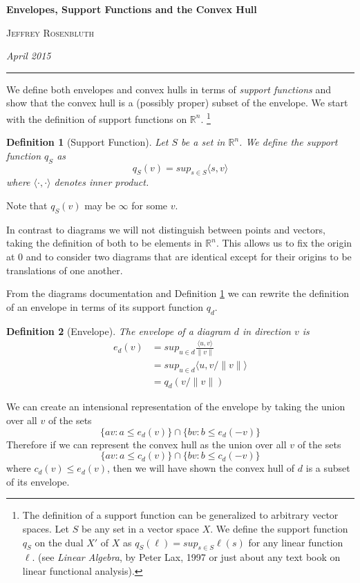 \documentclass[11pt]{amsart}
\newtheorem{defn}{Definition}
\begin{document}
\begin{center}
\bigskip 
\textbf{Envelopes, Support Functions and the Convex Hull}

\textsc{Jeffrey Rosenbluth}

\textit{April 2015}
\end{center}
\hrule
\vspace{0.25in}

We define both envelopes and convex hulls in terms of \emph{support functions} and show
that the convex hull is a (possibly proper) subset of the envelope. We start with the definition of support functions
on  $\mathbb{R}^n$.
\footnote{
The definition of a support function can be generalized to arbitrary vector spaces.
Let $S$ be any set in a vector space $X$. We define the support function $q_S$ on the dual $X'$ of $X$ as 
$q_S(\ell) = sup_{s \in S} \ell(s)$
for any linear function $\ell.$ 
(see \emph{Linear Algebra}, by Peter Lax, 1997 or just about any  text book on linear functional analysis).
}
\begin{defn}[Support Function]
\label{supportfunc}
Let $S$ be a set in $\mathbb{R}^n$. We define the support function $q_S$ as 
$$q_S(v) = sup_{s \in S} \langle s,v \rangle$$
where $\langle \cdot, \cdot \rangle$ denotes inner product.
\end{defn}

Note that $q_S(v)$ may be $\infty$ for some $v$. 

In contrast to diagrams we will not distinguish between points and vectors, taking the definition of both to be elements in $\mathbb{R}^n$.
This allows us to fix the origin at $0$ and to consider two diagrams that are identical except for their origins to be translations of one another.

From the diagrams documentation and Definition \ref{supportfunc} we can rewrite the definition of an envelope 
in terms of its support function $q_d$.
\begin{defn}[Envelope]
The envelope of a diagram $d$ in direction $v$ is
\begin{align}
e_d(v) &= sup_{u \in d} \frac{\langle u, v \rangle}{\|v\|}\\
           &=sup_{u \in d} \langle u, v/\|v\| \rangle\\
           &=q_d(v/\|v\|)
\end{align}
\end{defn}

We can create an intensional representation of the envelope by taking the union over all $v$ of the sets
$$\{av : a \leq e_d(v)\} \cap \{ bv : b \leq e_d(-v)\}$$
Therefore if we can represent the convex hull as the union over all $v$ of the sets
$$\{av : a \leq c_d(v)\} \cap \{ bv : b \leq c_d(-v)\}$$
where $c_d(v) \leq e_d(v)$, then we will have shown the convex hull of $d$ is a subset of its envelope.
\end{document}

